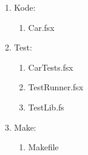 \begin{enumerate}
\item Kode: 
    \begin{enumerate}
        \item Car.fsx
    \end{enumerate}
\item Test: 
    \begin{enumerate}
        \item CarTests.fsx
        \item TestRunner.fsx
        \item TestLib.fs
    \end{enumerate}
\item Make:
    \begin{enumerate}
        \item Makefile
    \end{enumerate}
\end{enumerate}

